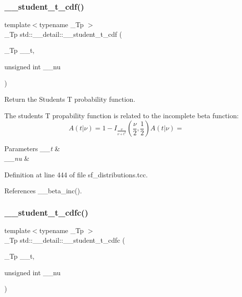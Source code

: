 \subsubsection{\texorpdfstring{\+\_\+\+\_\+student\+\_\+t\+\_\+cdf()}{\_\_student\_t\_cdf()}}
{\footnotesize\ttfamily template$<$typename \+\_\+\+Tp $>$ \\
\+\_\+\+Tp std\+::\+\_\+\+\_\+detail\+::\+\_\+\+\_\+student\+\_\+t\+\_\+cdf (\begin{DoxyParamCaption}\item[{\+\_\+\+Tp}]{\+\_\+\+\_\+t,  }\item[{unsigned int}]{\+\_\+\+\_\+nu }\end{DoxyParamCaption})}



Return the Students T probability function. 

The students T propability function is related to the incomplete beta function\+: \[ A(t|\nu) = 1 - I_{\frac{\nu}{\nu + t^2}}(\frac{\nu}{2}, \frac{1}{2}) A(t|\nu) = \]


\begin{DoxyParams}{Parameters}
{\em \+\_\+\+\_\+t} & \\
\hline
{\em \+\_\+\+\_\+nu} & \\
\hline
\end{DoxyParams}


Definition at line 444 of file sf\+\_\+distributions.\+tcc.



References \+\_\+\+\_\+beta\+\_\+inc().

\mbox{\label{namespacestd_1_1____detail_a3009eaaa4b7d6d845878765ef0e3fa27}} 
\subsubsection{\texorpdfstring{\+\_\+\+\_\+student\+\_\+t\+\_\+cdfc()}{\_\_student\_t\_cdfc()}}
{\footnotesize\ttfamily template$<$typename \+\_\+\+Tp $>$ \\
\+\_\+\+Tp std\+::\+\_\+\+\_\+detail\+::\+\_\+\+\_\+student\+\_\+t\+\_\+cdfc (\begin{DoxyParamCaption}\item[{\+\_\+\+Tp}]{\+\_\+\+\_\+t,  }\item[{unsigned int}]{\+\_\+\+\_\+nu }\end{DoxyParamCaption})}




